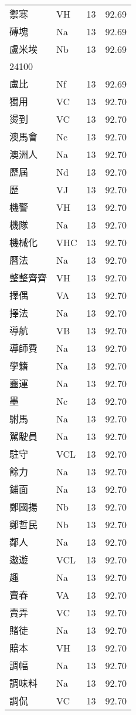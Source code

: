\documentclass[twocolumn]{book}
\begin{document}
\begin{supertabular}{llrr}
禦寒 & VH & 13 &  92.69\\
磚塊 & Na & 13 &  92.69\\
盧米埃 & Nb & 13 &  92.69\\
24100\\
盧比 & Nf & 13 &  92.69\\
獨用 & VC & 13 &  92.70\\
燙到 & VC & 13 &  92.70\\
澳馬會 & Nc & 13 &  92.70\\
澳洲人 & Na & 13 &  92.70\\
歷屆 & Nd & 13 &  92.70\\
歷 & VJ & 13 &  92.70\\
機警 & VH & 13 &  92.70\\
機隊 & Na & 13 &  92.70\\
機械化 & VHC & 13 &  92.70\\
曆法 & Na & 13 &  92.70\\
整整齊齊 & VH & 13 &  92.70\\
擇偶 & VA & 13 &  92.70\\
擇法 & Na & 13 &  92.70\\
導航 & VB & 13 &  92.70\\
導師費 & Na & 13 &  92.70\\
學籍 & Na & 13 &  92.70\\
噩運 & Na & 13 &  92.70\\
墨 & Nc & 13 &  92.70\\
駙馬 & Na & 13 &  92.70\\
駕駛員 & Na & 13 &  92.70\\
駐守 & VCL & 13 &  92.70\\
餘力 & Na & 13 &  92.70\\
鋪面 & Na & 13 &  92.70\\
鄭國揚 & Nb & 13 &  92.70\\
鄭哲民 & Nb & 13 &  92.70\\
鄰人 & Na & 13 &  92.70\\
遨遊 & VCL & 13 &  92.70\\
趣 & Na & 13 &  92.70\\
賣春 & VA & 13 &  92.70\\
賣弄 & VC & 13 &  92.70\\
賭徒 & Na & 13 &  92.70\\
賠本 & VH & 13 &  92.70\\
調幅 & Na & 13 &  92.70\\
調味料 & Na & 13 &  92.70\\
調侃 & VC & 13 &  92.70\\

\end{supertabular}
\end{document}
